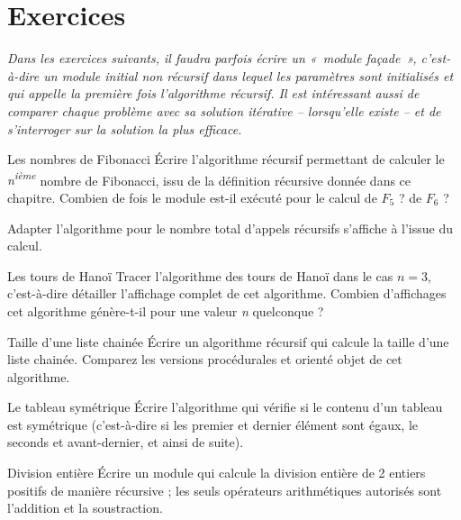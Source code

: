 \section{Exercices}

	{\itshape
	Dans les exercices suivants, il faudra parfois écrire un 
	«~module façade~», c'est-à-dire un module initial non récursif
	dans lequel les paramètres sont initialisés et qui appelle 
	la première fois l'algorithme récursif. Il est intéressant
	aussi de comparer chaque problème avec sa solution itérative 
	-- lorsqu'elle existe -- et de s'interroger sur la
	solution la plus efficace.}

	\begin{Exercice}{Les nombres de Fibonacci}
		Écrire l'algorithme récursif permettant de calculer le 
		\textit{n\textsuperscript{ième}} nombre de Fibonacci, 
		issu de la définition récursive donnée dans ce chapitre. 
		Combien de fois le module est-il exécuté pour le calcul de
		$F_5$ ? de $F_6$ ?

		Adapter l'algorithme pour le nombre total d'appels récursifs 
		s'affiche à l'issue du calcul.

	\end{Exercice}
	
	\begin{Exercice}{Les tours de Hanoï}
		Tracer l'algorithme des tours de Hanoï dans le cas 
		$n = 3$, c'est-à-dire détailler l'affichage complet de cet
		algorithme. Combien d'affichages cet algorithme génère-t-il 
		pour une valeur \textit{n} quelconque ?
	\end{Exercice}
	
	\begin{Exercice}{Taille d'une liste chainée}
		Écrire un algorithme récursif qui calcule la taille d'une liste 
		chainée. Comparez les versions procédurales et orienté
		objet de cet algorithme.
	\end{Exercice}
	
	\begin{Exercice}{Le tableau symétrique}
		Écrire l'algorithme qui vérifie si le contenu d'un tableau 
		est symétrique (c'est-à-dire si les premier et dernier
		élément sont égaux, le seconds et avant-dernier, et ainsi de suite).
	\end{Exercice}

	\begin{Exercice}{Division entière}
		Écrire un module qui calcule la division entière de 2 entiers 
		positifs de manière récursive ; les seuls opérateurs
		arithmétiques autorisés sont l'addition et la soustraction.
	\end{Exercice}

